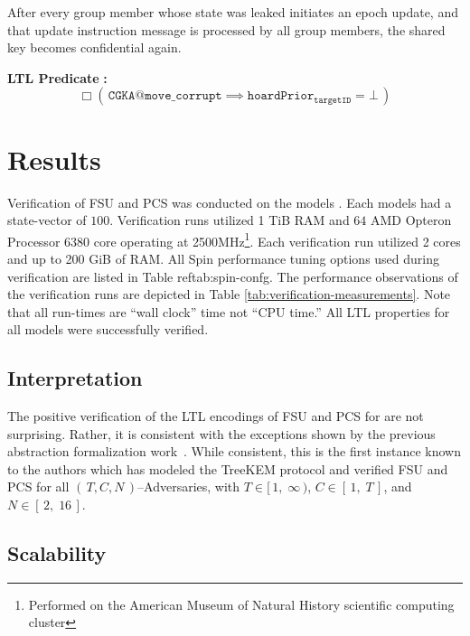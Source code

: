\documentclass[runningheads]{llncs}
\newcommand{\Abrev}[1]{\gls{#1}}
\newcommand{\NumericRange}[2]{\ensuremath{\left[\,#1,\; #2\,\right]}\xspace}
\newcommand{\NumericRangeOpenR}[2]{\ensuremath{[\,#1,\; #2\,)}\xspace}
\begin{document}
\begin{definition}
After every group member whose state was leaked initiates an epoch update, and that update instruction message is processed by all group members, the shared key becomes confidential again.
\end{definition}%
\noindent\textbf{LTL Predicate} \textbf{:}%
\[%
\Box \left(\, \texttt{CGKA@move\_corrupt} \implies \texttt{hoardPrior}_{\texttt{targetID}} = \bot \,\right)%
\]%


\section{Results}


Verification of  \Abrev{FSU} and \Abrev{PCS} was conducted on the models .
Each models had a state-vector of $100$\siBytes.
Verification runs utilized 1 TiB RAM and \(64\) AMD Opteron Processor 6380 core operating at 2500MHz\footnote{Performed on the American Museum of Natural History scientific computing cluster}.
Each verification run utilized 2 cores and up to 200 GiB of RAM.
All Spin performance tuning options used during verification are listed in Table ref{tab:spin-confg}.
The performance observations of the verification runs are depicted in Table \ref{tab:verification-measurements}.
Note that all run-times are ``wall clock'' time not ``CPU time.''
All \Abrev{LTL} properties for all models were successfully verified.

\subsection{Interpretation}

The positive verification of the LTL encodings of  \Abrev{FSU} and \Abrev{PCS} for  are not surprising.
Rather, it is consistent with the exceptions shown by the previous \CGKAdef abstraction formalization work~\cite{alwen2020security}.
While consistent, this is the first instance known to the authors which has modeled the TreeKEM protocol and verified \Abrev{FSU} and \Abrev{PCS} for all $(\,T, C, N\,)$--Adversaries, with $T \in \NumericRangeOpenR{1}{\infty}$, $C \in \NumericRange{1}{T}$, and $N \in \NumericRange{2}{16}$.

\subsection{Scalability}
\end{document}
